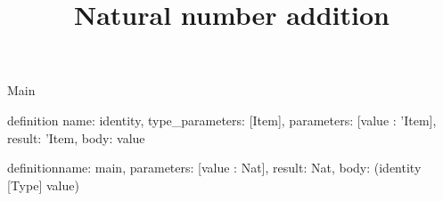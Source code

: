 \begin{lexlean}{Main}
\title{Natural number addition}
\begin{semanticmodule}
definition{
  name: identity,
  type_parameters: [Item],
  parameters: [value : 'Item],
  result: 'Item,
  body: value
}

definition{name: main, parameters: [value : Nat], result: Nat, body: (identity [Type] value)}
\end{semanticmodule}
\end{lexlean}
